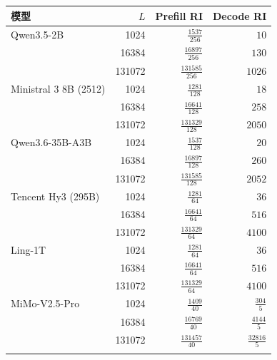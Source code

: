 \begin{tabular}{@{}lrrr@{}}\toprule
模型 & $L$ & Prefill RI & Decode RI\\\midrule
Qwen3.5-2B & 1024 & $\frac{1537}{256}$ & $10$\\[5pt]
 & 16384 & $\frac{16897}{256}$ & $130$\\[5pt]
 & 131072 & $\frac{131585}{256}$ & $1026$\\[5pt]
\addlinespace[2pt]
Ministral 3 8B (2512) & 1024 & $\frac{1281}{128}$ & $18$\\[5pt]
 & 16384 & $\frac{16641}{128}$ & $258$\\[5pt]
 & 131072 & $\frac{131329}{128}$ & $2050$\\[5pt]
\addlinespace[2pt]
Qwen3.6-35B-A3B & 1024 & $\frac{1537}{128}$ & $20$\\[5pt]
 & 16384 & $\frac{16897}{128}$ & $260$\\[5pt]
 & 131072 & $\frac{131585}{128}$ & $2052$\\[5pt]
\addlinespace[2pt]
Tencent Hy3 (295B) & 1024 & $\frac{1281}{64}$ & $36$\\[5pt]
 & 16384 & $\frac{16641}{64}$ & $516$\\[5pt]
 & 131072 & $\frac{131329}{64}$ & $4100$\\[5pt]
\addlinespace[2pt]
Ling-1T & 1024 & $\frac{1281}{64}$ & $36$\\[5pt]
 & 16384 & $\frac{16641}{64}$ & $516$\\[5pt]
 & 131072 & $\frac{131329}{64}$ & $4100$\\[5pt]
\addlinespace[2pt]
MiMo-V2.5-Pro & 1024 & $\frac{1409}{40}$ & $\frac{304}{5}$\\[5pt]
 & 16384 & $\frac{16769}{40}$ & $\frac{4144}{5}$\\[5pt]
 & 131072 & $\frac{131457}{40}$ & $\frac{32816}{5}$\\[5pt]
\addlinespace[2pt]
\bottomrule\end{tabular}
